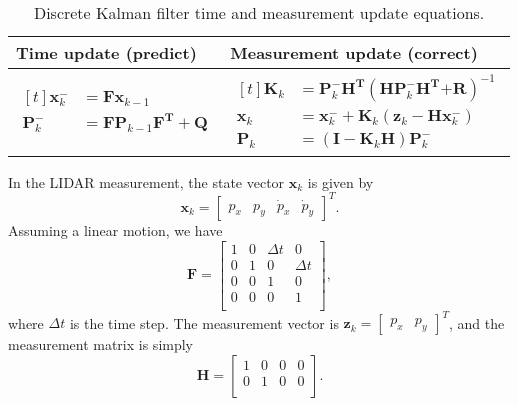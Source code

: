 \documentclass[12pt]{article}
\begin{document}
\begin{table}[h]
	\renewcommand{\arraystretch}{1.5}
	\caption{Discrete Kalman filter time and measurement update equations.}
	\centering
	\label{tab:table-KF}
	\begin{tabular}{C{7cm}|C{7cm}}
		\hline
		Time update (predict) & Measurement update (correct) \\
		\hline
		$\begin{aligned}[t]
			\mathbf{x}_{k}^{-} &= \mathbf{F}\mathbf{x}_{k - 1} \\
			\mathbf{P}_{k}^{-} &= \mathbf{F}\mathbf{P}_{k - 1}\mathbf{F}^{\mathbf{T}} + \mathbf{Q}
		\end{aligned}$ &
		$\begin{aligned}[t]
			\mathbf{K}_{k} &= \mathbf{P}_{k}^{-}\mathbf{H}^{\mathbf{T}}( \mathbf{H}\mathbf{P}_{k}^{-}\mathbf{H}^{\mathbf{T}}\mathbf{+ R})^{- 1} \\
			\mathbf{x}_{k} &= \mathbf{x}_{k}^{-} + \mathbf{K}_{k}( \mathbf{z}_{k} - \mathbf{H}\mathbf{x}_{k}^{-}) \\
			\mathbf{P}_{k} &= ( \mathbf{I} - \mathbf{K}_{k}\mathbf{H})\mathbf{P}_{k}^{-}
		\end{aligned}$ \\
		\hline
	\end{tabular}
\end{table}

In the LIDAR measurement, the state vector \(\mathbf{x}_{k}\) is given by
%
\begin{equation}
	\mathbf{x}_{k} = \begin{bmatrix} p_{x} & p_{y} & \dot{p}_{x} & \dot{p}_{y}\end{bmatrix}^{T}.
\end{equation}
%
Assuming a linear motion, we have
%
\begin{equation}
	\mathbf{F} = \begin{bmatrix}
	1 & 0 & \Delta t & 0 \\
	0 & 1 & 0 & \Delta t \\
	0 & 0 & 1 & 0 \\
	0 & 0 & 0 & 1 \\
	\end{bmatrix},
\end{equation}
%
where \(\Delta t\) is the time step. The measurement vector is \(\mathbf{z}_{k} = \begin{bmatrix} p_{x} & p_{y} \end{bmatrix}^{T}\), and the measurement matrix is simply
%
\begin{equation}
	\mathbf{H} = \begin{bmatrix}
	1 & 0 & 0 & 0 \\
	0 & 1 & 0 & 0 \\
	\end{bmatrix}.
\end{equation}
\end{document}
